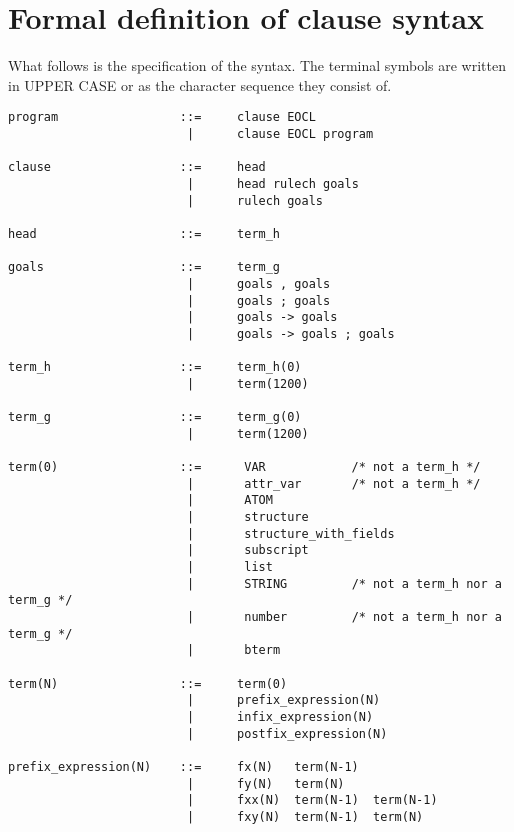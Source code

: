 \section{Formal definition of clause syntax}
What follows is the specification of the syntax. The terminal symbols are
written in UPPER CASE or as the character sequence they consist of.
\begin{verbatim}
program                 ::=     clause EOCL
                         |      clause EOCL program

clause                  ::=     head
                         |      head rulech goals
                         |      rulech goals

head                    ::=     term_h

goals                   ::=     term_g
                         |      goals , goals
                         |      goals ; goals
                         |      goals -> goals
                         |      goals -> goals ; goals

term_h                  ::=     term_h(0)
                         |      term(1200)

term_g                  ::=     term_g(0)
                         |      term(1200)

term(0)                 ::=      VAR            /* not a term_h */
                         |       attr_var       /* not a term_h */
                         |       ATOM
                         |       structure
                         |       structure_with_fields
                         |       subscript
                         |       list
                         |       STRING         /* not a term_h nor a term_g */
                         |       number         /* not a term_h nor a term_g */
                         |       bterm

term(N)                 ::=     term(0)
                         |      prefix_expression(N)
                         |      infix_expression(N)
                         |      postfix_expression(N)

prefix_expression(N)    ::=     fx(N)   term(N-1)
                         |      fy(N)   term(N)
                         |      fxx(N)  term(N-1)  term(N-1)
                         |      fxy(N)  term(N-1)  term(N)
\end{verbatim}
\vfill\pagebreak %
